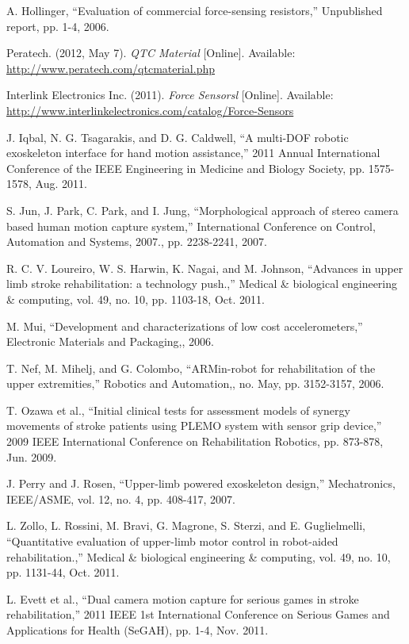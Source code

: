 \documentclass[journal]{IEEEtran}
\begin{document}
\begin{thebibliography}{1}
 A. Hollinger, “Evaluation of commercial force-sensing resistors,” Unpublished report, pp. 1-4, 2006.

 Peratech. (2012, May 7). \emph{QTC Material} [Online]. Available: \url{http://www.peratech.com/qtcmaterial.php}

 Interlink Electronics Inc. (2011). \emph{Force Sensorsl} [Online]. Available: \url{http://www.interlinkelectronics.com/catalog/Force-Sensors}

 J. Iqbal, N. G. Tsagarakis, and D. G. Caldwell, “A multi-DOF robotic exoskeleton interface for hand motion assistance,” 2011 Annual International Conference of the IEEE Engineering in Medicine and Biology Society, pp. 1575-1578, Aug. 2011.

 S. Jun, J. Park, C. Park, and I. Jung, “Morphological approach of stereo camera based human motion capture system,” International Conference on Control, Automation and Systems, 2007., pp. 2238-2241, 2007.

 R. C. V. Loureiro, W. S. Harwin, K. Nagai, and M. Johnson, “Advances in upper limb stroke rehabilitation: a technology push.,” Medical \& biological engineering \& computing, vol. 49, no. 10, pp. 1103-18, Oct. 2011.

 M. Mui, “Development and characterizations of low cost accelerometers,” Electronic Materials and Packaging,, 2006.

 T. Nef, M. Mihelj, and G. Colombo, “ARMin-robot for rehabilitation of the upper extremities,” Robotics and Automation,, no. May, pp. 3152-3157, 2006.

 T. Ozawa et al., “Initial clinical tests for assessment models of synergy movements of stroke patients using PLEMO system with sensor grip device,” 2009 IEEE International Conference on Rehabilitation Robotics, pp. 873-878, Jun. 2009.

 J. Perry and J. Rosen, “Upper-limb powered exoskeleton design,” Mechatronics, IEEE/ASME, vol. 12, no. 4, pp. 408-417, 2007.

 L. Zollo, L. Rossini, M. Bravi, G. Magrone, S. Sterzi, and E. Guglielmelli, “Quantitative evaluation of upper-limb motor control in robot-aided rehabilitation.,” Medical \& biological engineering \& computing, vol. 49, no. 10, pp. 1131-44, Oct. 2011.

 L. Evett et al., “Dual camera motion capture for serious games in stroke rehabilitation,” 2011 IEEE 1st International Conference on Serious Games and Applications for Health (SeGAH), pp. 1-4, Nov. 2011.


\end{thebibliography}
\end{document}
